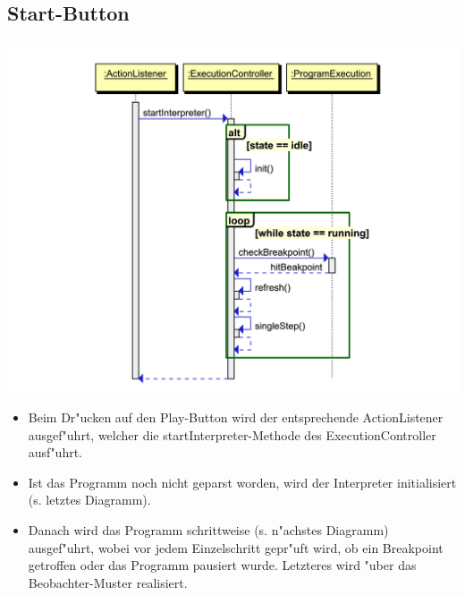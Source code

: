 \documentclass[10pt,a4paper,titlepage]{article}
\begin{document}
\subsection{Start-Button}
\includegraphics[scale=0.9]{images/Button_play.pdf} \newline
\begin{itemize}
\item Beim Dr"ucken auf den Play-Button wird der entsprechende ActionListener ausgef"uhrt, welcher die startInterpreter-Methode des ExecutionController ausf"uhrt.
\item Ist das Programm noch nicht geparst worden, wird der Interpreter initialisiert (s. letztes Diagramm).
\item Danach wird das Programm schrittweise (s. n"achstes Diagramm) ausgef"uhrt, wobei vor jedem Einzelschritt gepr"uft wird, ob ein Breakpoint getroffen oder das Programm pausiert wurde. Letzteres wird "uber das Beobachter-Muster realisiert.
\end{itemize}
\end{document}
